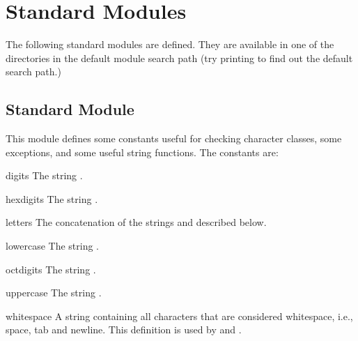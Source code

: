 \chapter{Standard Modules}

The following standard modules are defined.  They are available in one
of the directories in the default module search path (try printing
 to find out the default search path.)

\section{Standard Module }


This module defines some constants useful for checking character
classes, some exceptions, and some useful string functions.
The constants are:

\renewcommand{\indexsubitem}{(data in module string)}
\begin{datadesc}{digits}
  The string .
\end{datadesc}

\begin{datadesc}{hexdigits}
  The string .
\end{datadesc}

\begin{datadesc}{letters}
  The concatenation of the strings  and
   described below.
\end{datadesc}

\begin{datadesc}{lowercase}
  The string .
\end{datadesc}

\begin{datadesc}{octdigits}
  The string .
\end{datadesc}

\begin{datadesc}{uppercase}
  The string .
\end{datadesc}

\begin{datadesc}{whitespace}
  A string containing all characters that are considered whitespace,
  i.e., space, tab and newline.  This definition is used by
   and .
\end{datadesc}

